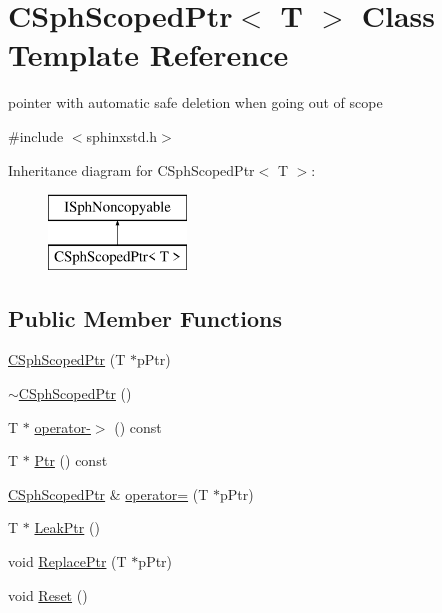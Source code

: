 \hypertarget{classCSphScopedPtr}{\section{C\-Sph\-Scoped\-Ptr$<$ T $>$ Class Template Reference}
\label{classCSphScopedPtr}
}


pointer with automatic safe deletion when going out of scope  




{\ttfamily \#include $<$sphinxstd.\-h$>$}

Inheritance diagram for C\-Sph\-Scoped\-Ptr$<$ T $>$\-:\begin{figure}[H]
\begin{center}
\leavevmode
\includegraphics[height=2.000000cm]{classCSphScopedPtr}
\end{center}
\end{figure}
\subsection*{Public Member Functions}
\begin{DoxyCompactItemize}
\item 
\hyperlink{classCSphScopedPtr_aa1d4c4a7ab9230e99866fd75a7225d60}{C\-Sph\-Scoped\-Ptr} (T $\ast$p\-Ptr)
\item 
\hyperlink{classCSphScopedPtr_a25e7bc3fbf3af2460e5c529f84e7ad96}{$\sim$\-C\-Sph\-Scoped\-Ptr} ()
\item 
T $\ast$ \hyperlink{classCSphScopedPtr_a622900bcf99de8151c51ba1441e1c097}{operator-\/$>$} () const 
\item 
T $\ast$ \hyperlink{classCSphScopedPtr_a3dee7a5de9c2b126a94a55fc78cec0e5}{Ptr} () const 
\item 
\hyperlink{classCSphScopedPtr}{C\-Sph\-Scoped\-Ptr} \& \hyperlink{classCSphScopedPtr_a4f178f06e5e0d465f156ead545c58fbd}{operator=} (T $\ast$p\-Ptr)
\item 
T $\ast$ \hyperlink{classCSphScopedPtr_a6db95d65d3489a0d6e7532220160730a}{Leak\-Ptr} ()
\item 
void \hyperlink{classCSphScopedPtr_a9d7945ef97eae6bb9b763f3d5fbf278f}{Replace\-Ptr} (T $\ast$p\-Ptr)
\item 
void \hyperlink{classCSphScopedPtr_a85c5cc64b928ddd411b07dea57fb2e8f}{Reset} ()
\end{DoxyCompactItemize}
